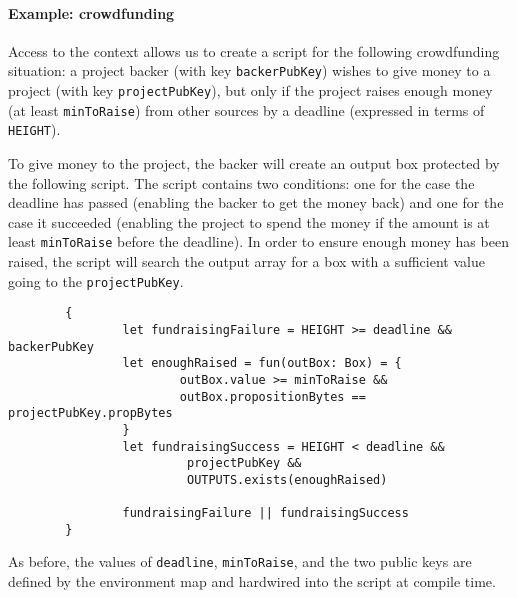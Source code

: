 \documentclass[11pt]{article}
\begin{document}
\paragraph{Example: crowdfunding}
Access to the context allows us to create a script for the following crowdfunding situation: a project backer (with key  \texttt{backerPubKey}) wishes to give money to a project (with key \texttt{projectPubKey}), but only if the project raises enough money (at least \texttt{minToRaise}) from other sources by a deadline (expressed in terms of \texttt{HEIGHT}). 

To give money to the project, the backer will create an output box protected by the following script. The script contains two conditions: one for the case the deadline has passed (enabling the backer to get the money back) and one for the case it succeeded (enabling the project to spend the money if the amount is at least \texttt{minToRaise} before the deadline).  In order to ensure enough money has been raised, the script will search the output array for a box with a sufficient value going to the \texttt{projectPubKey}.

\begin{verbatim}
        {
                let fundraisingFailure = HEIGHT >= deadline && backerPubKey
                let enoughRaised = fun(outBox: Box) = {
                        outBox.value >= minToRaise && 
                        outBox.propositionBytes == projectPubKey.propBytes
                }
                let fundraisingSuccess = HEIGHT < deadline &&
                         projectPubKey &&  
                         OUTPUTS.exists(enoughRaised)
                 
                fundraisingFailure || fundraisingSuccess
        }
\end{verbatim}

As before, the values of \texttt{deadline}, \texttt{minToRaise}, and the two public keys are defined by the environment map and hardwired into the script at compile time. 
\end{document}
